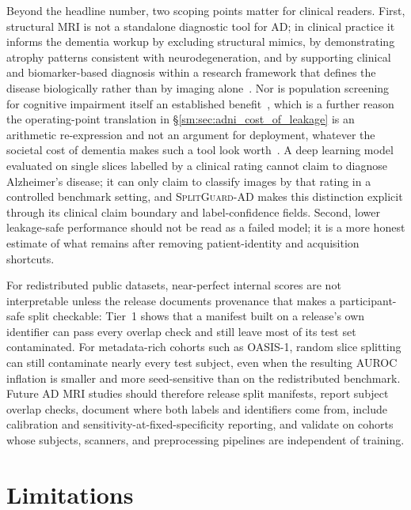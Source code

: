\documentclass[11pt]{article}
\newcommand{\SGA}{\textsc{SplitGuard-AD}}
\begin{document}
Beyond the headline number, two scoping points matter for clinical
readers. First, structural MRI is not a standalone diagnostic tool for
AD; in clinical practice it informs the dementia workup by excluding
structural mimics, by demonstrating atrophy patterns consistent with
neurodegeneration, and by supporting clinical and biomarker-based
diagnosis within a research framework that defines the disease
biologically rather than by imaging
alone~\cite{jack2018niaaa}. Nor is population screening for cognitive
impairment itself an established benefit~\cite{lin2013screening}, which
is a further reason the operating-point translation in
\S\ref{sm:sec:adni_cost_of_leakage} is an arithmetic re-expression and
not an argument for deployment, whatever the societal cost of dementia
makes such a tool look worth~\cite{wittenberg2019dementiacosts}. A deep learning model evaluated on single slices labelled by a
clinical rating cannot claim to diagnose Alzheimer's disease; it can
only claim to classify images by that rating in a controlled benchmark
setting, and \SGA{} makes this distinction explicit through its
clinical claim boundary and label-confidence fields. Second,
lower leakage-safe performance should not be read as a failed model;
it is a more honest estimate of what remains after removing
patient-identity and acquisition shortcuts.

For redistributed public datasets, near-perfect internal scores are
not interpretable unless the release documents provenance that makes a
participant-safe split checkable: Tier~1 shows that a manifest built on
a release's own identifier can pass every overlap check and still
leave most of its test set contaminated. For metadata-rich cohorts
such as OASIS-1, random slice splitting can still contaminate nearly
every test subject, even when the resulting AUROC inflation is smaller
and more seed-sensitive than on the redistributed benchmark. Future AD
MRI studies should therefore release split manifests, report subject
overlap checks, document where both labels and identifiers come from,
include calibration and sensitivity-at-fixed-specificity reporting,
and validate on cohorts whose subjects, scanners, and preprocessing
pipelines are independent of training.



\section{Limitations}
\label{sm:sec:limitations}
\end{document}
